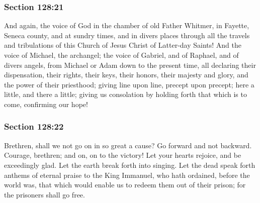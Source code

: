 	\subsubsection{Section 128:21} %
		\label{DC128-21}

		And again, the voice of God in the chamber of old Father Whitmer, in Fayette, Seneca county, and at sundry times, and in divers places through all the travels and tribulations of this Church of Jesus Christ of Latter-day Saints! And the voice of Michael, the archangel; the voice of Gabriel, and of Raphael, and of divers angels, from Michael or Adam down to the present time, all declaring their dispensation, their rights, their keys, their honors, their majesty and glory, and the power of their priesthood; giving line upon line, precept upon precept; here a little, and there a little; giving us consolation by holding forth that which is to come, confirming our hope!


	\subsubsection{Section 128:22} %
		\label{DC128-22}

		Brethren, shall we not go on in so great a cause? Go forward and not backward. Courage, brethren; and on, on to the victory! Let your hearts rejoice, and be exceedingly glad. Let the earth break forth into singing. Let the dead speak forth anthems of eternal praise to the King Immanuel, who hath ordained, before the world was, that which would enable us to redeem them out of their prison; for the prisoners shall go free.


